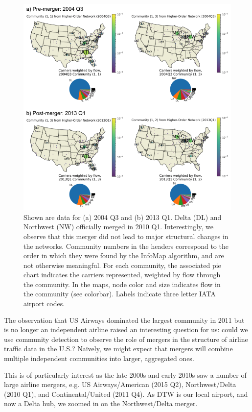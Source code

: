 \documentclass[sigconf]{acmart}
\begin{document}
\begin{figure}
    \centering
    \includegraphics[width=\textwidth]{figs/DL_NW_merger.png}
    \caption{Shown are data for (a) 2004 Q3 and (b) 2013 Q1. Delta (DL) and Northwest (NW) officially merged in 2010 Q1. Interestingly, we observe that this merger did not lead to major structural changes in the networks. Community numbers in the headers correspond to the order in which they were found by the InfoMap algorithm, and are not otherwise meaningful. For each community, the associated pie chart indicates the carriers represented, weighted by flow through the community. In the maps, node color and size indicates flow in the community (see colorbar). Labels indicate three letter IATA airport codes.}
    \label{fig:merger}
\end{figure}

The observation that US Airways dominated the largest community in 2011 but is no longer an independent airline raised an interesting question for us: could we use community detection to observe the role of mergers in the structure of airline traffic data in the U.S.? Na\"ively, we might expect that mergers will combine multiple independent communities into larger, aggregated ones.

This is of particularly interest as the late 2000s and early 2010s saw a number of large airline mergers, e.g. US Airways/American (2015 Q2), Northwest/Delta (2010 Q1), and Continental/United (2011 Q4). As DTW is our local airport, and now a Delta hub, we zoomed in on the Northwest/Delta merger.
\end{document}
